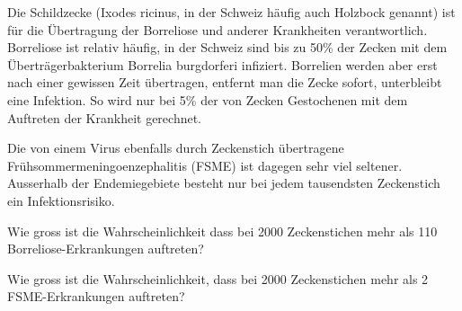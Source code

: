 Die Schildzecke (Ixodes ricinus, in der Schweiz häufig auch Holzbock genannt) 
ist für die Über\-tragung der Borreliose und anderer Krankheiten verantwortlich.
Borreliose ist relativ häufig, in der Schweiz sind bis zu 50\% der Zecken mit
dem Überträgerbakterium Borrelia burgdorferi infiziert.
Borrelien werden aber erst nach einer gewissen Zeit übertragen,
entfernt man die Zecke sofort, unterbleibt eine Infektion.
So wird nur bei 5\% der von Zecken Gestochenen mit dem Auftreten
der Krankheit gerechnet.

Die von einem Virus ebenfalls durch Zeckenstich übertragene
Frühsommermeningoenzephalitis (FSME) ist dagegen sehr viel seltener.
Ausserhalb der Endemiegebiete besteht nur bei jedem tausendsten Zeckenstich
ein Infektionsrisiko.


\begin{teilaufgaben}
\item
Wie gross ist die Wahrscheinlichkeit dass bei 2000 Zeckenstichen mehr als 110
Borreliose-Erkrankungen auftreten?
\item
Wie gross ist die Wahrscheinlichkeit, dass bei 2000 Zeckenstichen mehr als 2
FSME-Er\-kran\-kun\-gen auftreten?
\end{teilaufgaben}

